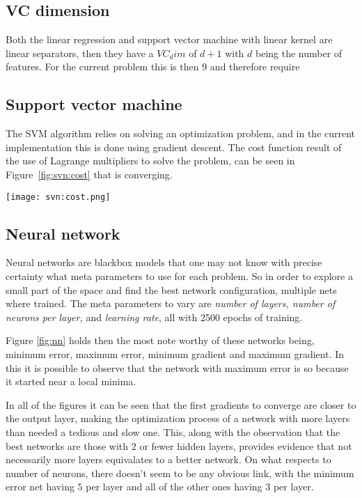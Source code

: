 
\subsection{VC dimension}
Both the linear regression and support vector machine with linear kernel are
linear separators, then they have a $VC_dim$ of $d+1$ with $d$ being the number
of features. For the current problem this is then $9$ and therefore require
    


\subsection{Support vector machine}

The SVM algorithm relies on solving an optimization problem, and in the current
implementation this is done using gradient descent. The cost function result of
the use of Lagrange multipliers to solve the problem, can be seen in
Figure~\ref{fig:svn:cost} that is converging.

\begin{figure*}[t]
    \texttt{[image: svn:cost.png]}
    \caption{Cost function of the optimization problem for SVM
    \label{fig:svn:cost}}
\end{figure*}

\subsection{Neural network}

Neural networks are blackbox models that one may not know with precise certainty
what meta parameters to use for each problem. So in order to explore a small
part of the space and find the best network configuration, multiple nets where
trained. The meta parameters to vary are \textit{number of layers, number of
neurons per layer,} and \textit{learning rate}, all with 2500 epochs of
training. 

Figure \ref{fig:nn} holds then the most note worthy of these networks
being, minimum error, maximum error, minimum gradient and maximum gradient.
In this it is possible to observe that the network with maximum error is so
because it started near a local minima. 

In all of the figures it can be seen that the first gradients to converge are
closer to the output layer, making the optimization process of a network with
more layers than needed a tedious and slow one. This, along with the observation
that the best networks are those with $2$ or fewer hidden layers, provides
evidence that not necessarily more layers equivalates to a better network. On
what respects to number of neurons, there doesn't seem to be any obvious link,
with the minimum error net having $5$ per layer and all of the other ones having
$3$ per layer.

